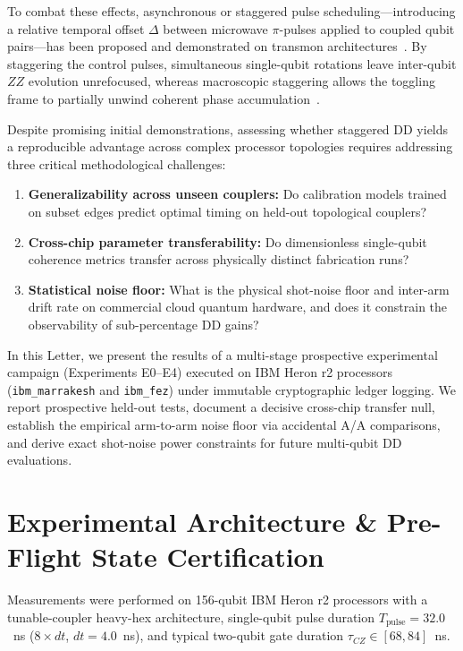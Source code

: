 \documentclass[aps,prl,twocolumn,amsmath,amssymb,superscriptaddress,floatfix]{revtex4-2}
\begin{document}
To combat these effects, asynchronous or staggered pulse scheduling---introducing a relative temporal offset $\Delta$ between microwave $\pi$-pulses applied to coupled qubit pairs---has been proposed and demonstrated on transmon architectures~\cite{Niu2024, Tripathi2022}. By staggering the control pulses, simultaneous single-qubit rotations leave inter-qubit $ZZ$ evolution unrefocused, whereas macroscopic staggering allows the toggling frame to partially unwind coherent phase accumulation~\cite{Niu2024}. 

Despite promising initial demonstrations, assessing whether staggered DD yields a reproducible advantage across complex processor topologies requires addressing three critical methodological challenges:
\begin{enumerate}
    \item \textbf{Generalizability across unseen couplers:} Do calibration models trained on subset edges predict optimal timing on held-out topological couplers?
    \item \textbf{Cross-chip parameter transferability:} Do dimensionless single-qubit coherence metrics transfer across physically distinct fabrication runs?
    \item \textbf{Statistical noise floor:} What is the physical shot-noise floor and inter-arm drift rate on commercial cloud quantum hardware, and does it constrain the observability of sub-percentage DD gains?
\end{enumerate}

In this Letter, we present the results of a multi-stage prospective experimental campaign (Experiments E0--E4) executed on IBM Heron r2 processors (\texttt{ibm\_marrakesh} and \texttt{ibm\_fez}) under immutable cryptographic ledger logging. We report prospective held-out tests, document a decisive cross-chip transfer null, establish the empirical arm-to-arm noise floor via accidental A/A comparisons, and derive exact shot-noise power constraints for future multi-qubit DD evaluations.

\section{Experimental Architecture \& Pre-Flight State Certification}
Measurements were performed on 156-qubit IBM Heron r2 processors with a tunable-coupler heavy-hex architecture, single-qubit pulse duration $T_{\text{pulse}} = 32.0$~ns ($8\times dt$, $dt = 4.0$~ns), and typical two-qubit gate duration $\tau_{CZ} \in [68, 84]$~ns. 
\end{document}
